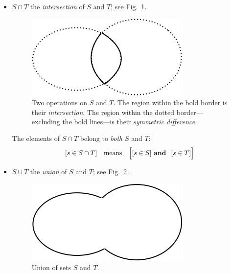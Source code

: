 \begin{itemize}
\item
$S \cap T$ the {\it intersection} of $S$ and $T$; see Fig.~\ref{fig:setIntersection}.
\begin{figure}[htb]
\begin{center}
        \includegraphics[scale=0.4]{FiguresMaths/setIntersection}
        \caption{Two operations on $S$ and $T$. The region within the bold border is their {\em intersection}. The region within the dotted border---excluding the bold lines---is their {\em symmetric difference}.}
        \label{fig:setIntersection}
\end{center}
\end{figure}

\smallskip

The elements of $S \cap T$ belong to {\em both} $S$ and $T$:
\[ [s \in S \cap T] \ \ \mbox{ means } \ \ 
\Big[ [s \in S] \ \mbox{\bf and } \ [s \in T] \Big]
\]

\item
$S \cup T$ the {\it union} of $S$ and $T$; see Fig.~\ref{fig:setUnion} .
\begin{figure}[htb]
\begin{center}
        \includegraphics[scale=0.4]{FiguresMaths/setUnion}
        \caption{Union of sets $S$ and $T$.}
        \label{fig:setUnion}
\end{center}
\end{figure}

\smallskip


\end{itemize}
